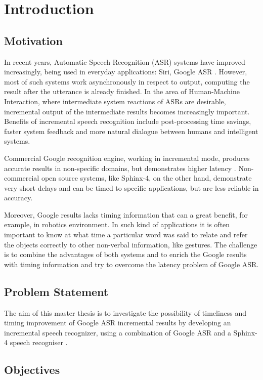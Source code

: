 \chapter{Introduction}
\label{chap:introduction}
\section {Motivation}
In recent years, Automatic Speech Recognition (ASR) systems have improved
increasingly, being used in everyday applications: Siri, Google ASR 
\parencite {mcgrawgrauenstein2012}. However, most of such systems work
asynchronously in respect to output, computing the result after the utterance is already finished.
In the area of Human-Machine Interaction, 
where intermediate system reactions of ASRs are 
desirable,  incremental output of the intermediate results becomes increasingly
important. Benefits of  incremental speech recognition include post-processing
time savings, faster system feedback and more natural dialogue between humans
and intelligent systems. 

Commercial Google recognition
engine, working in incremental mode, produces accurate
results in non-specific domains, but demonstrates higher latency
\parencite{mcgrawgrauenstein2012}.  Non-commercial open source systems, like Sphinx-4, on the other hand, demonstrate very short delays and can be timed to specific
applications, but are less reliable in accuracy.

Moreover, Google results lacks timing information that can a great
benefit, for example, in robotics environment. In such kind of applications it
is often important to know at what time a particular word was said to relate and
refer the objects correctly to other non-verbal information, like gestures.
The challenge is to combine the advantages of both systems and to enrich
the Google results with timing information and try to overcome the latency
problem of Google ASR.
\section {Problem Statement}
The aim of this master thesis is to investigate the possibility of
timeliness and timing improvement of Google ASR
incremental results by developing an incremental speech recognizer, using a
combination of Google ASR \parencite
{mcgrawgrauenstein2012} and a Sphinx-4 speech recogniser
\parencite {baumannetal2009:naacl}. 
\section {Objectives}

